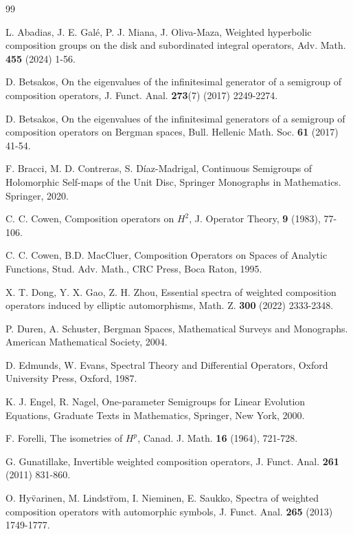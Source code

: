 \documentclass{amsart}
\theoremstyle{proclaim}
\theoremstyle{fancyproclaim}
\theoremstyle{definition}
\theoremstyle{fancystatement}
\numberwithin{equation}{section}
\begin{document}
\begin{thebibliography}{99}

 L. Abadias, J. E. Gal\'e, P. J. Miana, J. Oliva-Maza, Weighted hyperbolic composition groups on the disk and subordinated integral operators, Adv. Math. \textbf{455} (2024) 1-56.  

 D. Betsakos, On the eigenvalues of the infinitesimal generator of a semigroup of composition operators, J. Funct. Anal. \textbf{273}(7) (2017) 2249-2274.

 D. Betsakos, On the eigenvalues of the infinitesimal generators of a semigroup of composition operators on Bergman spaces, Bull. Hellenic Math. Soc. \textbf{61} (2017) 41-54.

 F. Bracci, M. D. Contreras, S. D\'iaz-Madrigal, Continuous Semigroups of Holomorphic Self-maps of the Unit Disc, Springer Monographs in Mathematics. Springer, 2020.

 C. C. Cowen, Composition operators on $H^2$, J. Operator Theory, \textbf{9} (1983), 77-106.

 C. C. Cowen, B.D. MacCluer, Composition Operators on Spaces of Analytic Functions, Stud. Adv. Math., CRC Press, Boca Raton, 1995.

 X. T. Dong, Y. X. Gao, Z. H. Zhou, Essential spectra of weighted composition operators induced by elliptic automorphisms, Math. Z. \textbf{300} (2022) 2333-2348.

 P. Duren, A. Schuster, Bergman Spaces, Mathematical Surveys and Monographs. American
Mathematical Society, 2004.

 D. Edmunds, W. Evans, Spectral Theory and Differential Operators, Oxford University Press, Oxford, 1987.

 K. J. Engel, R. Nagel, One-parameter Semigroups for Linear Evolution Equations, Graduate Texts in Mathematics, Springer, New York, 2000.

 F. Forelli, The isometries of $H^p$, Canad. J. Math. \textbf{16} (1964), 721-728.

 G. Gunatillake, Invertible weighted composition operators, J. Funct. Anal. \textbf{261} (2011) 831-860.

 O. Hy\"varinen, M. Lindst\"rom, I. Nieminen, E. Saukko, Spectra of weighted composition operators with automorphic symbols, J. Funct. Anal. \textbf{265} (2013) 1749-1777.



\end{thebibliography}
\end{document}
